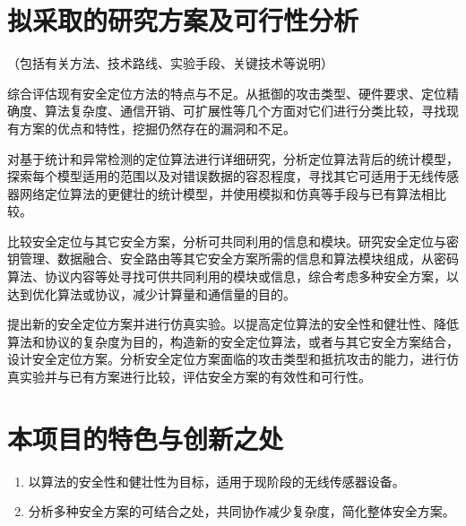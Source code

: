 \documentclass[a4paper,10pt]{article}
\begin{document}
\section{拟采取的研究方案及可行性分析} 

（包括有关方法、技术路线、实验手段、关键技术等说明）

综合评估现有安全定位方法的特点与不足。从抵御的攻击类型、硬件要求、定位精确度、算法复杂度、通信开销、可扩展性等几个方面对它们进行分类比较，寻找现有方案的优点和特性，挖掘仍然存在的漏洞和不足。

对基于统计和异常检测的定位算法进行详细研究，分析定位算法背后的统计模型，探索每个模型适用的范围以及对错误数据的容忍程度，寻找其它可适用于无线传感器网络定位算法的更健壮的统计模型，并使用模拟和仿真等手段与已有算法相比较。

比较安全定位与其它安全方案，分析可共同利用的信息和模块。研究安全定位与密钥管理、数据融合、安全路由等其它安全方案所需的信息和算法模块组成，从密码算法、协议内容等处寻找可供共同利用的模块或信息，综合考虑多种安全方案，以达到优化算法或协议，减少计算量和通信量的目的。

提出新的安全定位方案并进行仿真实验。以提高定位算法的安全性和健壮性、降低算法和协议的复杂度为目的，构造新的安全定位算法，或者与其它安全方案结合，设计安全定位方案。分析安全定位方案面临的攻击类型和抵抗攻击的能力，进行仿真实验并与已有方案进行比较，评估安全方案的有效性和可行性。

\section{本项目的特色与创新之处} 

\begin{enumerate}
\item 以算法的安全性和健壮性为目标，适用于现阶段的无线传感器设备。
\item 分析多种安全方案的可结合之处，共同协作减少复杂度，简化整体安全方案。
\end{enumerate}



\end{document}
